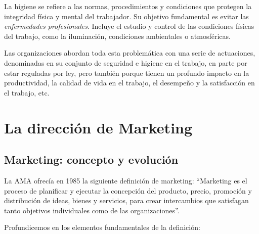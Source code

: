 \documentclass[10pt,a4paper,spanish]{report}
\begin{document}
                  La higiene se refiere a las normas, procedimientos y condiciones que protegen la integridad física y mental del trabajador. Su objetivo fundamental es evitar las \textit{\textcolor[rgb]{0.8,0.2,0.8}{enfermedades profesionales}}. Incluye el estudio y control de las condiciones físicas del trabajo, como la iluminación, condiciones ambientales o atmosféricas.

                  Las organizaciones abordan toda esta problemática con una serie de actuaciones, denominadas en su conjunto de seguridad e higiene en el trabajo, en parte por estar reguladas por ley, pero también porque tienen un profundo impacto en la productividad, la calidad de vida en el trabajo, el desempeño y la satisfacción en el trabajo, etc.

\chapter{\textcolor[rgb]{0.1,0.2,0.4}La dirección de Marketing}

	\section{\textcolor[rgb]{0.1,0.2,0.4}Marketing: concepto y evolución}

		La AMA ofrecía en 1985 la siguiente definición de marketing: ``Marketing es el proceso de planificar y ejecutar la concepción del producto, precio, promoción y distribución de ideas, bienes y servicios, para crear intercambios que satisfagan tanto objetivos individuales como de las organizaciones''.

		Profundicemos en los elementos fundamentales de la definición:
\end{document}
